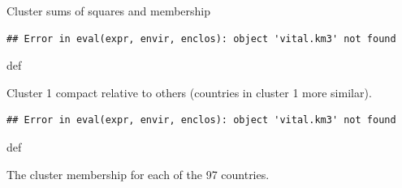 \documentclass[ignorenonframetext,]{beamer}
\newenvironment{Shaded}{\begin{snugshade}}{\end{snugshade}}
\newcommand{\NormalTok}[1]{#1}
\newcommand{\OperatorTok}[1]{\textcolor[rgb]{0.81,0.36,0.00}{\textbf{#1}}}
\begin{document}
\begin{frame}[fragile]{Cluster sums of squares and membership}
\protect\hypertarget{cluster-sums-of-squares-and-membership}{}

\begin{Shaded}
\end{Shaded}

\begin{verbatim}
## Error in eval(expr, envir, enclos): object 'vital.km3' not found
\end{verbatim}

def

Cluster 1 compact relative to others (countries in cluster 1 more
similar).

\begin{Shaded}
\end{Shaded}

\begin{verbatim}
## Error in eval(expr, envir, enclos): object 'vital.km3' not found
\end{verbatim}

def

The cluster membership for each of the 97 countries.

\end{frame}
\end{document}
